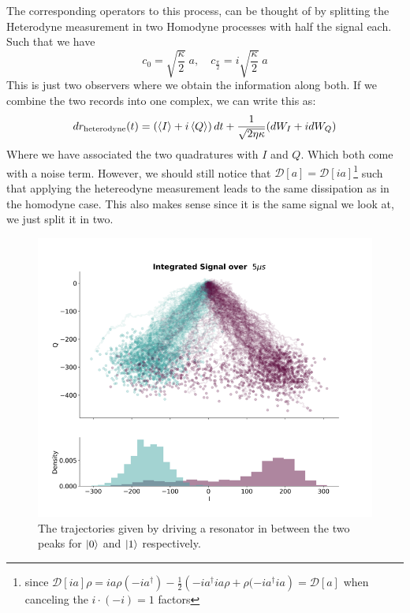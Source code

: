 The corresponding operators to this process, can be thought of by splitting the Heterodyne measurement in two Homodyne processes with half the signal each. Such that we have
\begin{equation}
    c_0 = \sqrt{\frac{\kappa}{2}}\; a, \quad c_{\frac{\pi}{2}} = i \sqrt{\frac{\kappa}{2}} \; a
\end{equation}
This is just two observers where we obtain the information along both. If we combine the two records into one complex, we can write this as:
\begin{equation}
    dr_{\text{heterodyne}}(t) = \left(\expval{I} + i\expval{Q}\right)dt  + \frac{1}{\sqrt{2\eta\kappa}}(dW_I + i dW_Q)
\end{equation}
Where we have associated the two quadratures with $I$ and $Q$. Which both come with a noise term. However, we should still notice that $\mathcal{D}[a] = \mathcal{D}[ia]$\footnote{since $\mathcal{D}[ia] \rho = ia\rho (-ia^\dagger) - \frac12 \left(-ia^\dagger ia \rho + \rho (-ia^\dagger ia\right) = \mathcal{D}[a]$ when canceling the $i \cdot (-i) = 1$ factors} such that applying the hetereodyne measurement leads to the same dissipation as in the homodyne case. This also makes sense since it is the same signal we look at, we just split it in two. 

\begin{figure}
    \centering
    \includegraphics{Figs/Theory/stochastic_signal.png}
    \caption{The trajectories given by driving a resonator in between the two peaks for $\ket{0}$ and $\ket{1}$ respectively.}
    \label{fig:stochastic_signal_hetereodyne}
\end{figure}

